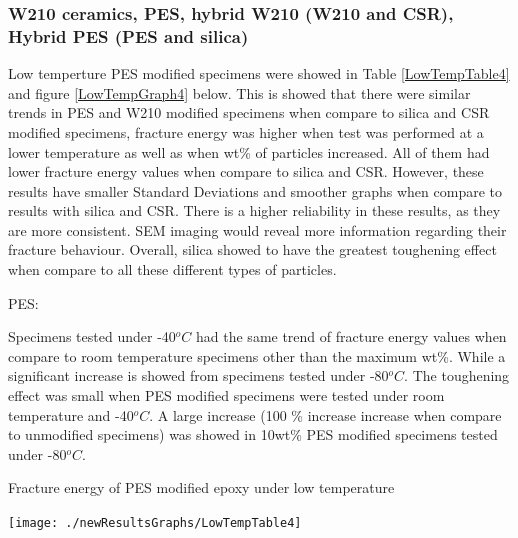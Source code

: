 \documentclass[numbers=noendperiod,chapterprefix=on]{icldt} %
\begin{document}
{\subsubsection{W210 ceramics, PES, hybrid W210 (W210 and CSR), Hybrid PES (PES and silica)}
Low temperture PES modified specimens were showed in Table \ref{LowTempTable4} and figure \ref{LowTempGraph4} below.
This is showed that there were similar trends in PES and W210 modified specimens when compare to silica and CSR modified specimens, fracture energy was higher when test was performed at a lower temperature as well as when wt\% of particles increased. All of them had lower fracture energy values when compare to silica and CSR. However, these results have smaller Standard Deviations and smoother graphs when compare to results with silica and CSR. There is a higher reliability in these results, as they are more consistent. SEM imaging would reveal more information regarding their fracture behaviour. Overall, silica showed to have the greatest toughening effect when compare to all these different types of particles.

PES:

Specimens tested under -40$^oC$ had the same trend of fracture energy values when compare to room temperature specimens other than the maximum wt\%. While a significant increase is showed from specimens tested under -80$^oC$. The toughening effect was small when PES modified specimens were tested under room temperature and -40$^oC$. A large increase (100 \% increase increase when compare to unmodified specimens) was showed in 10wt\% PES modified specimens tested under -80$^oC$. 

\begin{table}[!hp]
\centering
\caption{Fracture energy of PES modified epoxy under low temperature} \label{LowTempTable4}
\texttt{[image: ./newResultsGraphs/LowTempTable4]}
\end{table}
\FloatBarrier

}
\end{document}
